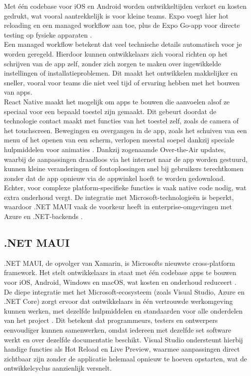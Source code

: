 Met één codebase voor iOS en Android worden ontwikkeltijden verkort en kosten gedrukt, wat vooral aantrekkelijk is voor kleine teams. Expo voegt hier hot reloading en een managed workflow aan toe, plus de Expo Go-app voor directe testing op fysieke apparaten \autocite{Ivanov2025}.\\

Een managed workflow betekent dat veel technische details automatisch voor je worden geregeld. Hierdoor kunnen ontwikkelaars zich vooral richten op het schrijven van de app zelf, zonder zich zorgen te maken over ingewikkelde instellingen of installatieproblemen. Dit maakt het ontwikkelen makkelijker en sneller, vooral voor teams die niet veel tijd of ervaring hebben met het bouwen van apps.\\

React Native maakt het mogelijk om apps te bouwen die aanvoelen alsof ze speciaal voor een bepaald toestel zijn gemaakt. Dit gebeurt doordat de technologie contact maakt met functies van het toestel zelf, zoals de camera of het touchscreen. Bewegingen en overgangen in de app, zoals het schuiven van een menu of het openen van een scherm, verlopen meestal soepel dankzij speciale hulpmiddelen voor animaties \autocite{Ivanov2025}. Dankzij zogenaamde Over-the-Air updates, waarbij de aanpassingen draadloos via het internet naar de app worden gestuurd, kunnen kleine veranderingen of foutoplossingen snel bij gebruikers terechtkomen zonder dat de app opnieuw via de appwinkel hoeft te worden gedownload.\\

Echter, voor complexe platform-specifieke functies is vaak native code nodig, wat extra onderhoud vergt. De integratie met Microsoft-technologieën is beperkt, waardoor .NET MAUI vaak de voorkeur heeft in enterprise-omgevingen met Azure en .NET-backends \autocite{Longe2025}.

\subsection{.NET MAUI}
.NET MAUI, de opvolger van Xamarin, is Microsofts nieuwste cross-platform framework. Het stelt ontwikkelaars in staat met één codebase apps te bouwen voor iOS, Android, Windows en macOS, wat kosten en onderhoud reduceert \autocite{Sheth2024}.\\

De diepe integratie met het Microsoft-ecosysteem (zoals Visual Studio, Azure en .NET Core) zorgt ervoor dat ontwikkelaars in één vertrouwde werkomgeving kunnen werken, met dezelfde hulpmiddelen en standaarden voor alle onderdelen van het project \autocite{Sheth2024}. Dit betekent dat programmeurs, testers en ontwerpers eenvoudiger kunnen samenwerken, omdat iedereen met dezelfde set software werkt en over dezelfde documentatie beschikt. Visual Studio ondersteunt hierbij handige functies als Hot Reload en Live Preview, waarmee aanpassingen direct zichtbaar zijn zonder de applicatie helemaal opnieuw te hoeven opstarten, wat de ontwikkelcyclus aanzienlijk versnelt.\\

